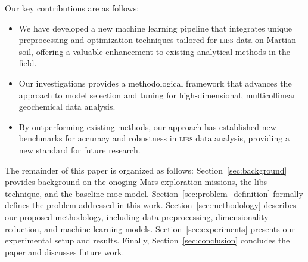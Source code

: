 Our key contributions are as follows:
\begin{itemize}
    \item We have developed a new machine learning pipeline that integrates unique preprocessing and optimization techniques tailored for \textsc{libs} data on Martian soil, offering a valuable enhancement to existing analytical methods in the field.
    \item Our investigations provides a methodological framework that advances the approach to model selection and tuning for high-dimensional, multicollinear geochemical data analysis.
    \item By outperforming existing methods, our approach has established new benchmarks for accuracy and robustness in \textsc{libs} data analysis, providing a new standard for future research.
\end{itemize}


The remainder of this paper is organized as follows: 
Section~\ref{sec:background} provides background on the onoging Mars exploration missions, the \gls{libs} technique, and the baseline \gls{moc} model. 
Section~\ref{sec:problem_definition} formally defines the problem addressed in this work.
Section~\ref{sec:methodology} describes our proposed methodology, including data preprocessing, dimensionality reduction, and machine learning models. 
Section~\ref{sec:experiments} presents our experimental setup and results.
Finally, Section~\ref{sec:conclusion} concludes the paper and discusses future work.
